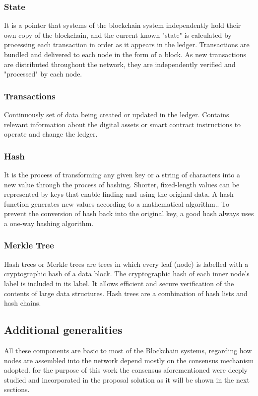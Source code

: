 \subsubsection{State}
It is a pointer that systems of the blockchain system independently hold their own copy of the blockchain, and the current known "state" is calculated by processing each transaction in order as it appears in the ledger. Transactions are bundled and delivered to each node in the form of a block. As new transactions are distributed throughout the network, they are independently verified and "processed" by each node.
\subsubsection{Transactions}
Continuously set of data being created or updated in the ledger. Contains relevant information about the digital assets or smart contract instructions to operate and change the ledger.
\subsubsection{Hash}
It is the process of transforming any given key or a string of characters into a new value through the process of hashing. Shorter, fixed-length values can be represented by keys that enable finding and using the original data. A hash function generates new values according to a mathematical algorithm.. To prevent the conversion of hash back into the original key, a good hash always uses a one-way hashing algorithm.

\subsubsection{Merkle Tree}

Hash trees or Merkle trees are trees in which every leaf (node) is labelled with a cryptographic hash of a data block. The cryptographic hash of each inner node's label is included in its label. It allows efficient and secure verification of the contents of large data structures. Hash trees are a combination of hash lists and hash chains.


\subsection{Additional generalities}
All these components are basic to most of the Blockchain systems, regarding how nodes are assembled into the network depend mostly on the consensus mechanism adopted. for the purpose of this work the consensus aforementioned were deeply studied and incorporated in the proposal solution as it will be shown in the next sections.